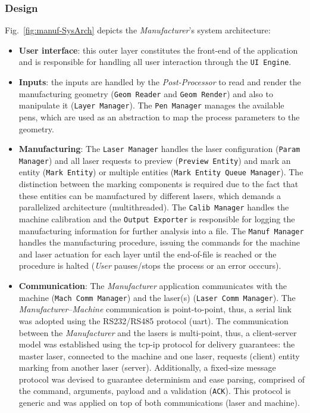 \subsubsection{Design}%
\label{sec:design-manuf}
Fig.~\ref{fig:manuf-SysArch} depicts the \emph{Manufacturer}'s system architecture:
\begin{itemize}
\item \textbf{User interface}: this outer layer constitutes the front-end of the
  application and is responsible for handling all user interaction through the
  \texttt{UI Engine}.
\item \textbf{Inputs}: the inputs are handled by the \emph{Post-Processor} to
  read and render the manufacturing geometry (\texttt{Geom Reader} and
  \texttt{Geom Render}) and also to manipulate it (\texttt{Layer Manager}). The
  \texttt{Pen Manager} manages the available pens, which are used as an
  abstraction to map the process parameters to the geometry.
\item \textbf{Manufacturing}: The \texttt{Laser Manager} handles the laser
  configuration (\texttt{Param Manager}) and all laser
  requests to preview (\texttt{Preview Entity}) and mark an entity
  (\texttt{Mark Entity}) or multiple entities (\texttt{Mark Entity Queue
    Manager}). The distinction between the marking components is required due to
  the fact that these entities can be manufactured by different lasers, which
  demands a parallelized architecture (multithreaded).
  The \texttt{Calib Manager} handles the machine calibration and the
  \texttt{Output Exporter} is responsible for logging the manufacturing
  information for further analysis into a file.
  The \texttt{Manuf Manager} handles the manufacturing procedure, issuing the
  commands for the machine and laser actuation for each layer until the
  end-of-file is reached or the procedure is halted (\emph{User} pauses/stops the process or an error occcurs).
\item \textbf{Communication}: The \emph{Manufacturer} application communicates
  with the machine (\texttt{Mach Comm Manager}) and the laser(s) (\texttt{Laser
    Comm Manager}). The \emph{Manufacturer}--\emph{Machine} communication is
  point-to-point, thus, a serial link was adopted using the RS232/RS485
  protocol (\gls{uart}). The communication between the \emph{Manufacturer} and
  the lasers is multi-point, thus, a client-server model was established using
  the \gls{tcp-ip} protocol for delivery guarantees: the master laser, connected
  to the machine and one laser, requests (client) entity marking from another
  laser (server).
  Additionally, a fixed-size message protocol was devised to guarantee
  determinism and ease parsing, comprised of the command, arguments, payload and
  a validation (\texttt{ACK}). This protocol is generic and was applied on top
  of both communications (laser and machine).
\end{itemize}

